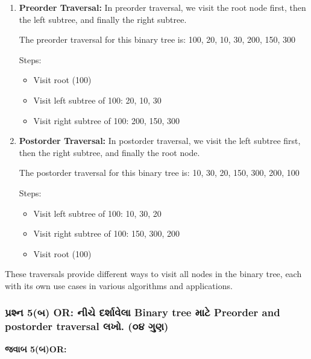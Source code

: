 \begin{enumerate}
\def\labelenumi{\arabic{enumi}.}
\item
  \textbf{Preorder Traversal:} In preorder traversal, we visit the root
  node first, then the left subtree, and finally the right subtree.

  The preorder traversal for this binary tree is: 100, 20, 10, 30, 200,
  150, 300

  Steps:

  \begin{itemize}
  \tightlist
  \item
    Visit root (100)
  \item
    Visit left subtree of 100: 20, 10, 30
  \item
    Visit right subtree of 100: 200, 150, 300
  \end{itemize}
\item
  \textbf{Postorder Traversal:} In postorder traversal, we visit the
  left subtree first, then the right subtree, and finally the root node.

  The postorder traversal for this binary tree is: 10, 30, 20, 150, 300,
  200, 100

  Steps:

  \begin{itemize}
  \tightlist
  \item
    Visit left subtree of 100: 10, 30, 20
  \item
    Visit right subtree of 100: 150, 300, 200
  \item
    Visit root (100)
  \end{itemize}
\end{enumerate}

These traversals provide different ways to visit all nodes in the binary
tree, each with its own use cases in various algorithms and
applications.

\hypertarget{uxaaauxab0uxab6uxaa8-5uxaac-or-uxaa8uxa9a-uxaa6uxab0uxab6uxab5uxab2-binary-tree-uxaaeuxa9f-preorder-and-postorder-traversal-uxab2uxa96.-uxae6uxaea-uxa97uxaa3}{%
\subsubsection{પ્રશ્ન 5(બ) OR: નીચે દર્શાવેલા Binary tree માટે Preorder and
postorder traversal લખો. (૦૪
ગુણ)}\label{uxaaauxab0uxab6uxaa8-5uxaac-or-uxaa8uxa9a-uxaa6uxab0uxab6uxab5uxab2-binary-tree-uxaaeuxa9f-preorder-and-postorder-traversal-uxab2uxa96.-uxae6uxaea-uxa97uxaa3}}

\textbf{જવાબ 5(બ)OR:}

